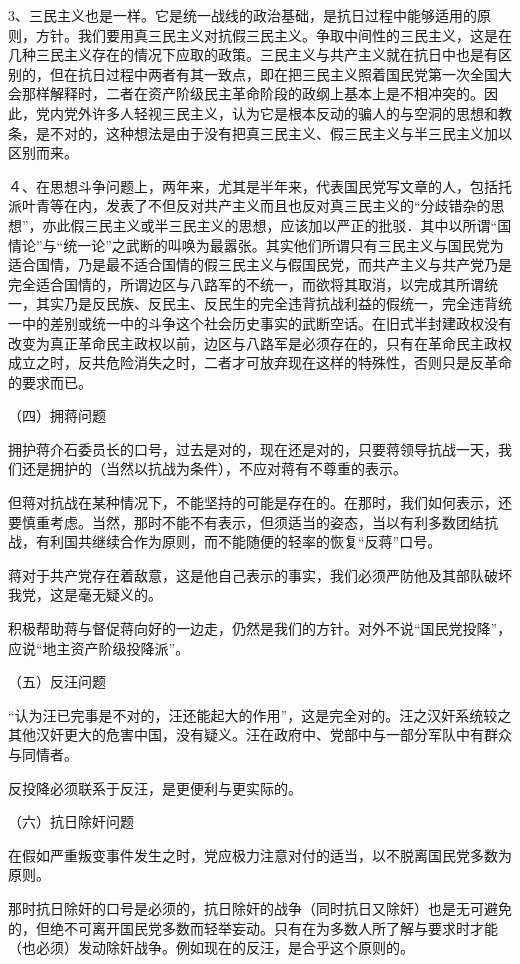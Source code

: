 3、三民主义也是一样。它是统一战线的政治基础，是抗日过程中能够适用的原则，方针。我们要用真三民主义对抗假三民主义。争取中间性的三民主义，这是在几种三民主义存在的情况下应取的政策。三民主义与共产主义就在抗日中也是有区别的，但在抗日过程中两者有其一致点，即在把三民主义照着国民党第一次全国大会那样解释时，二者在资产阶级民主革命阶段的政纲上基本上是不相冲突的。因此，党内党外许多人轻视三民主义，认为它是根本反动的骗人的与空洞的思想和教条，是不对的，这种想法是由于没有把真三民主义、假三民主义与半三民主义加以区别而来。

４、在思想斗争问题上，两年来，尤其是半年来，代表国民党写文章的人，包括托派叶青等在内，发表了不但反对共产主义而且也反对真三民主义的“分歧错杂的思想”，亦此假三民主义或半三民主义的思想，应该加以严正的批驳．其中以所谓“国情论”与“统一论”之武断的叫唤为最嚣张。其实他们所谓只有三民主义与国民党为适合国情，乃是最不适合国情的假三民主义与假国民党，而共产主义与共产党乃是完全适合国情的，所谓边区与八路军的不统一，而欲将其取消，以完成其所谓统一，其实乃是反民族、反民主、反民生的完全违背抗战利益的假统一，完全违背统一中的差别或统一中的斗争这个社会历史事实的武断空话。在旧式半封建政权没有改变为真正革命民主政权以前，边区与八路军是必须存在的，只有在革命民主政权成立之时，反共危险消失之时，二者才可放弃现在这样的特殊性，否则只是反革命的要求而已。

（四）拥蒋问题

拥护蒋介石委员长的口号，过去是对的，现在还是对的，只要蒋领导抗战一天，我们还是拥护的（当然以抗战为条件），不应对蒋有不尊重的表示。

但蒋对抗战在某种情况下，不能坚持的可能是存在的。在那时，我们如何表示，还要慎重考虑。当然，那时不能不有表示，但须适当的姿态，当以有利多数团结抗战，有利国共继续合作为原则，而不能随便的轻率的恢复“反蒋”口号。

蒋对于共产党存在着敌意，这是他自己表示的事实，我们必须严防他及其部队破坏我党，这是毫无疑义的。

积极帮助蒋与督促蒋向好的一边走，仍然是我们的方针。对外不说“国民党投降”，应说“地主资产阶级投降派”。

（五）反汪问题

“认为汪已完事是不对的，汪还能起大的作用”，这是完全对的。汪之汉奸系统较之其他汉奸更大的危害中国，没有疑义。汪在政府中、党部中与一部分军队中有群众与同情者。

反投降必须联系于反汪，是更便利与更实际的。


（六）抗日除奸问题

在假如严重叛变事件发生之时，党应极力注意对付的适当，以不脱离国民党多数为原则。

那时抗日除奸的口号是必须的，抗日除奸的战争（同时抗日又除奸）也是无可避免的，但绝不可离开国民党多数而轻举妄动。只有在为多数人所了解与要求时才能（也必须）发动除奸战争。例如现在的反汪，是合乎这个原则的。

